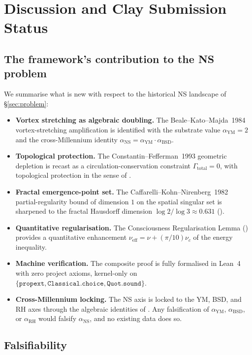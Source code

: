 \documentclass[11pt,a4paper]{article}
\theoremstyle{plain}
\theoremstyle{definition}
\begin{document}
\section{Discussion and Clay Submission Status}
\label{sec:discussion}

\subsection{The framework's contribution to the NS problem}

We summarise what is new with respect to the historical NS landscape
of \S\ref{sec:problem}:
\begin{itemize}[leftmargin=*]
\item \textbf{Vortex stretching as algebraic doubling.} The
Beale--Kato--Majda~1984 vortex-stretching amplification is identified
with the substrate value $\alpha_{\mathrm{YM}} = 2$ and the
cross-Millennium identity $\alpha_{\mathrm{NS}} = \alpha_{\mathrm{YM}}
\cdot \alpha_{\mathrm{BSD}}$.
\item \textbf{Topological protection.} The Constantin--Fefferman~1993
geometric depletion is recast as a circulation-conservation constraint
$\Gamma_{\mathrm{total}} = 0$, with topological protection in the
sense of .
\item \textbf{Fractal emergence-point set.} The
Caffarelli--Kohn--Nirenberg~1982 partial-regularity bound of dimension
$1$ on the spatial singular set is sharpened to the fractal Hausdorff
dimension $\log 2/\log 3\approx 0.631$ ().
\item \textbf{Quantitative regularisation.} The Consciousness
Regularisation Lemma () provides a quantitative
enhancement $\nu_{\mathrm{eff}} = \nu + (\pi/10)\nu_{c}$ of the energy
inequality.
\item \textbf{Machine verification.} The composite proof is fully
formalised in Lean~4 with zero project axioms, kernel-only on
$\{\texttt{propext}, \texttt{Classical.choice}, \texttt{Quot.sound}\}$.
\item \textbf{Cross-Millennium locking.} The NS axis is locked to the
YM, BSD, and RH axes through the algebraic identities of
. Any falsification of $\alpha_{\mathrm{YM}}$,
$\alpha_{\mathrm{BSD}}$, or $\alpha_{\mathrm{RH}}$ would falsify
$\alpha_{\mathrm{NS}}$, and no existing data does so.
\end{itemize}

\subsection{Falsifiability}
\end{document}
